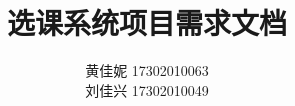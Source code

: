 \documentclass[12pt]{article} %
\title{\textbf{选课系统项目需求文档}}
\author{黄佳妮 17302010063 \\刘佳兴 17302010049}
\begin{document}
\begin{sloppypar}
\maketitle

\pagestyle{fancy}
\lhead{\textbf{{\thetitle}}}
\rhead{\textbf{\nouppercase{\firstleftmark}}}
\cfoot{\thepage}

\thispagestyle{empty}
\tableofcontents
\thispagestyle{empty}
\clearpage

\setcounter{page}{1}



\end{sloppypar}
\end{document}
